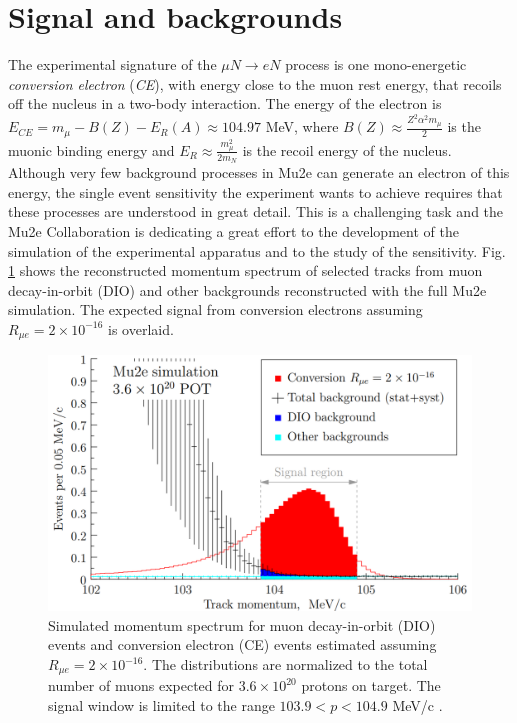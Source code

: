 \documentclass[12pt,a4paper,openright, oneside, titlepage]{book} %
\begin{document}
\section{Signal and backgrounds}
The experimental signature of the $\mu N \rightarrow eN$ process is one mono-energetic  \textit{conversion electron} (\textit{CE}), with energy close to the muon rest energy, that recoils off the nucleus in a two-body interaction.
The energy of the electron is $E_{CE} = m_\mu -B(Z) -E_R(A) \approx 104.97$ MeV, where  $B(Z)\approx\frac{Z^2\alpha^2m_\mu}{2}$ is the muonic binding energy  and $E_R\approx\frac{m_\mu^2}{2m_N}$ is the recoil energy of the nucleus.
Although very few background processes in Mu2e can generate an electron of this energy, the single event sensitivity the experiment wants to achieve requires that these processes are understood in great detail. 
This is a challenging task and the Mu2e Collaboration is dedicating a great effort to the development of the simulation of the experimental apparatus and to the study of the sensitivity. 
Fig. \ref{_signal_bg} shows the reconstructed momentum spectrum of selected tracks from muon decay-in-orbit (DIO) and other backgrounds reconstructed with the full Mu2e simulation. 
The expected signal from conversion electrons assuming $R_{\mu e} = 2 \times 10^{-16}$ is overlaid. 

\begin{figure}[h!]
\centering
\includegraphics[scale=0.6]{signal_bg}
\caption[Mu2e simulated signal]{Simulated momentum spectrum for muon decay-in-orbit (DIO) events and conversion electron (CE) events estimated assuming $R_{\mu e} = 2 \times 10 ^{-16}$. 
The distributions are normalized to the total number of muons expected for $3.6 \times 10^{20}$ protons on target. 
The signal window is limited to the range $103.9 < p < 104.9$ MeV/c \cite{Manolis} \cite{CD3}.}
\label{_signal_bg}
\end{figure}
\end{document}
